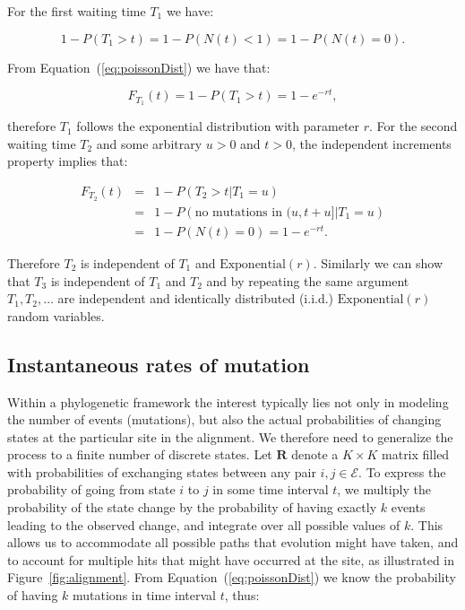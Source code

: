 \noindent
For the first waiting time $T_1$ we have:

\begin{equation}
1-P\left(T_{1}>t\right)=1-P\left(N(t)<1\right)=1-P\left(N(t)=0\right).
\end{equation}

\noindent
From Equation~(\ref{eq:poissonDist}) we have that:

\begin{equation}
F_{T_{1}}(t)=1-P\left(T_{1}>t\right)=1-e^{-r t},
\end{equation}

\noindent
therefore $T_1$ follows the exponential distribution with parameter $r$.
For the second waiting time $T_2$ and some arbitrary $u>0$ and $t>0$, the independent increments property implies that:

\begin{eqnarray}
F_{T_{2}}(t) &=& 1-P\left(T_{2}>t|T_{1}=u\right) \\ \nonumber
& = & 1-P\left(\text{no mutations in }(u,t+u]|T_{1}=u\right) \\ \nonumber 
& = & 1-P\left(N(t)=0\right)=1-e^{-r t}.
\end{eqnarray}

\noindent
Therefore $T_2$ is independent of $T_1$ and $\text{Exponential}(r)$. 
Similarly we can show that $T_3$ is independent of $T_1$ and $T_2$ and by repeating the same argument $T_1,T_2,\ldots$ are independent and identically distributed (i.i.d.) $\text{Exponential}(r)$ random variables.


\subsection{Instantaneous rates of mutation\label{sub:rates}}

Within a phylogenetic framework the interest typically lies not only in modeling the number of events (mutations), but also the actual probabilities of changing states at the particular site in the alignment. 
We therefore need to generalize the process to a finite number of discrete states.
Let $\mathbf{R}$ denote a $K \times K$ matrix filled with probabilities of exchanging states between any pair $i,j\in \mathcal{E}$.
To express the probability of going from state $i$ to $j$ in some time interval $t$, we multiply the probability of the state change by the probability of having exactly $k$ events leading to the observed change, and integrate over all possible values of $k$.
This allows us to accommodate all possible paths that evolution might have taken, and to account for multiple hits that might have occurred at the site, as illustrated in Figure~\ref{fig:alignment}.
From Equation~(\ref{eq:poissonDist}) we know the probability of having $k$ mutations in time interval $t$, thus:

